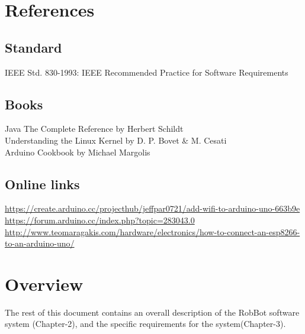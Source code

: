 \section{References}
\subsection{Standard}
IEEE Std. 830-1993: IEEE Recommended Practice for Software Requirements
\subsection{Books}
Java The Complete Reference by Herbert Schildt\\
Understanding the Linux Kernel by D. P. Bovet \& M. Cesati\\
Arduino Cookbook by Michael Margolis
\subsection{Online links}
\url{https://create.arduino.cc/projecthub/jeffpar0721/add-wifi-to-arduino-uno-663b9e}
\\\url{https://forum.arduino.cc/index.php?topic=283043.0}
\\\url{http://www.teomaragakis.com/hardware/electronics/how-to-connect-an-esp8266-to-an-arduino-uno/}
\\\url{}
\section{Overview}
The rest of this document contains an overall description of the RobBot software system (Chapter-2), and the specific requirements for the system(Chapter-3).
